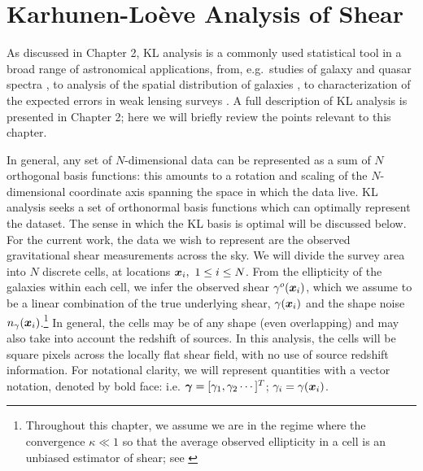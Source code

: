 \section{Karhunen-Lo\`{e}ve Analysis of Shear}
\label{KL_Intro}
As discussed in Chapter 2, KL analysis is a commonly used statistical tool
in a broad range of astronomical applications, from, e.g.~studies of 
galaxy and quasar spectra \citep{Connolly95,Connolly99,Yip04a,Yip04b}, to 
analysis of the spatial distribution of galaxies 
\citep{Vogeley96,Matsubara00,Pope04}, to characterization of the 
expected errors in weak lensing surveys \citep{Kilbinger06, Munshi06}.
A full description of KL analysis is presented in Chapter 2; here we
will briefly review the points relevant to this chapter.

In general, any set of $N$-dimensional data can be represented as a sum of 
$N$ orthogonal basis functions: this amounts to a rotation and scaling of 
the $N$-dimensional coordinate axis spanning the space in which the data live.
KL analysis seeks a set of orthonormal basis functions which can optimally
represent the dataset.  The sense in which the KL basis is optimal will be
discussed below.  For the current work, the data we wish to represent are the 
observed gravitational shear measurements across the sky.  
We will divide the survey 
area into $N$ discrete cells, at locations $\myvec{x}_i,\ 1\le i \le N$.  
From the ellipticity of the galaxies within each cell, 
we infer the observed shear $\gamma^o(\boldsymbol{x}_i)$, which we assume
to be a linear combination of the true underlying shear, $\gamma(\boldsymbol{x}_i)$
and the shape noise $n_\gamma(\boldsymbol{x}_i)$.\footnote{
Throughout this chapter, we assume we are in the regime where the convergence
$\kappa \ll 1$ so that the average observed ellipticity in a 
cell is an unbiased estimator of shear; see \citet{Bartelmann01}}
In general, the cells may be of any shape (even overlapping) 
and may also take into account the redshift of sources.
In this analysis, the cells will be square pixels across the locally 
flat shear field, with no use of source redshift information.  
For notational clarity, we will represent quantities with a vector notation,
denoted by bold face: i.e. $\boldsymbol{\gamma} = [\gamma_1,\gamma_2\cdots]^T$; 
$\gamma_i = \gamma(\boldsymbol{x}_i)$. 

